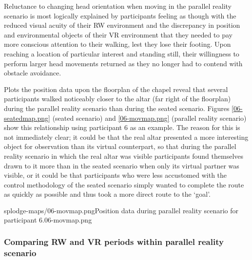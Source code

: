 Reluctance to changing head orientation when moving in the parallel reality scenario is most logically explained by participants feeling as though with the reduced visual acuity of their RW environment and the discrepancy in position and environmental objects of their VR environment that they needed to pay more conscious attention to their walking, lest they lose their footing. Upon reaching a location of particular interest and standing still, their willingness to perform larger head movements returned as they no longer had to contend with obstacle avoidance.


Plots the position data upon the floorplan of the chapel reveal that several participants walked noticeably closer to the altar (far right of the floorplan) during the parallel reality scenario than during the seated scenario. Figures \ref{06-seatedmap.png} (seated scenario) and \ref{06-movmap.png} (parallel reality scenario) show this relationship using participant 6 as an example. The reason for this is not immediately clear; it could be that the real altar presented a more interesting object for observation than its virtual counterpart, so that during the parallel reality scenario in which the real altar was visible participants found themselves drawn to it more than in the seated scenario when only its virtual partner was visible, or it could be that participants who were less accustomed with the control methodology of the seated scenario simply wanted to complete the route as quickly as possible and thus took a more direct route to the `goal'.

       {splodge-maps/06-movmap.png}{Position data during parallel reality scenario for participant 6.}{06-movmap.png}


\subsubsection{Comparing RW and VR periods within parallel reality scenario}

